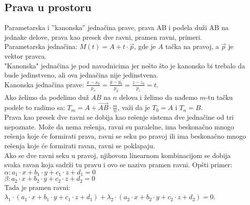 \documentclass[12pt]{article}
\newcommand{\vek}[1]{\overrightarrow{#1}}
\begin{document}
    \subsection{Prava u prostoru}
    Parametarska i ”kanonska” jednačina prave, prava AB i
    podela duži AB na jednake delove, prava kao presek dve
    ravni, pramen ravni, primeri.
    \\[1cm]
    Parametarska jednačina: $M(t)=A+t\cdot\vek{p}$,
    gde je $A$ tačka na pravoj, a $\vek{p}$ je vektor
    pravca.\\
    "Kanonska" jednačina je pod navodnicima jer nešto što je kanonsko bi
    trebalo da bude jedinstveno, ali ova jednačina nije jedinstvena.\\
    Kanonska jednačina prave: $\frac{x-x_0}{p_x}=\frac{y-y_0}{p_y}=\frac{z-z_0}{p_z}=t$.\\
    Ako želimo da podelimo duž $AB$ na $n$ delova i
    želimo da nađemo $m$-tu tačku podele to radimo sa:
$T_m=A+\vek{AB}\cdot\frac{m}{n}$, važi da je
$T_0=A$ i $T_n=B$.\\
    Prava kao presek dve ravni se dobija kao rešenje sistema
    dve jednačine od tri nepoznate. Može da nema rešenja, ravni su paralelne,
    ima beskonačno mnogo rešenja koje će formirati prava, ravni se seku po pravoj ili
    ima beskonačno mnogo rešenja koje će formirati ravan, ravni se poklapaju.\\
    Ako se dve ravni seku u pravoj, njihovom linearnom kombinacijom
    se dobija svaka ravan koja sadrži tu pravu i ovo se naziva
    pramen ravni. Opšti primer:\\
$\alpha: a_1\cdot x+b_1\cdot y+c_1\cdot z+d_1=0$\\
$\beta: a_2\cdot x+b_2\cdot y+c_2\cdot z+d_2=0$\\
    Tada je pramen ravni:\\
$\lambda_1\cdot(a_1\cdot x+b_1\cdot y+c_1\cdot z+d_1)+\lambda_2\cdot (a_2\cdot x+b_2\cdot y+c_2\cdot z+d_2)=0$.
    \par
\end{document}
